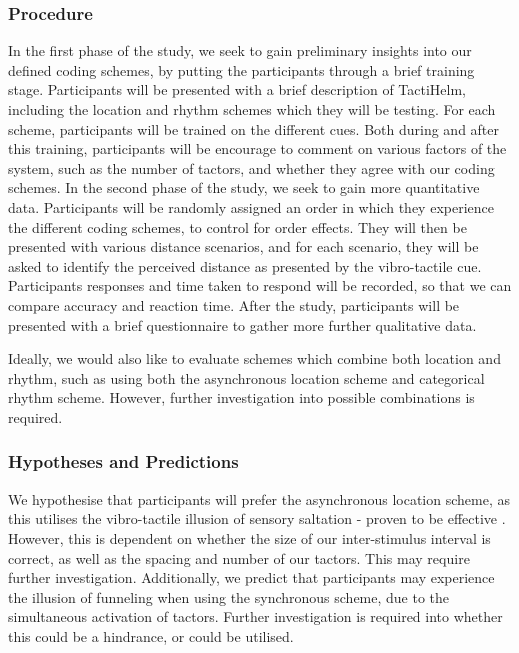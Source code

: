 \documentclass{interim}
\begin{document}
\subsubsection{Procedure}\label{sec:lab-procedure}
In the first phase of the study, we seek to gain preliminary insights into our defined coding schemes, by putting the participants through a brief training stage. Participants will be presented with a brief description of TactiHelm, including the location and rhythm schemes which they will be testing. For each scheme, participants will be trained on the different cues. Both during and after this training, participants will be encourage to comment on various factors of the system, such as the number of tactors, and whether they agree with our coding schemes. In the second phase of the study, we seek to gain more quantitative data. Participants will be randomly assigned an order in which they experience the different coding schemes, to control for order effects. They will then be presented with various distance scenarios, and for each scenario, they will be asked to identify the perceived distance as presented by the vibro-tactile cue. Participants responses and time taken to respond will be recorded, so that we can compare accuracy and reaction time. After the study, participants will be presented with a brief questionnaire to gather more further qualitative data.

Ideally, we would also like to evaluate schemes which combine both location and rhythm, such as using both the asynchronous location scheme and categorical rhythm scheme. However, further investigation into possible combinations is required.

\subsubsection{Hypotheses and Predictions}\label{sec:predictions}
We hypothesise that participants will prefer the asynchronous location scheme, as this utilises the vibro-tactile illusion of sensory saltation - proven to be effective \cite{5710913}. However, this is dependent on whether the size of our inter-stimulus interval is correct, as well as the spacing and number of our tactors. This may require further investigation. Additionally, we predict that participants may experience the illusion of funneling when using the synchronous scheme, due to the simultaneous activation of tactors. Further investigation is required into whether this could be a hindrance, or could be utilised.
\end{document}
